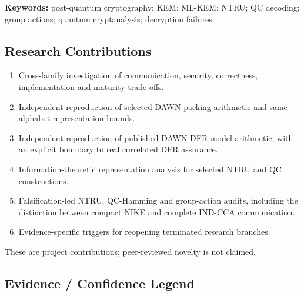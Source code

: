 \documentclass[
  10pt,
  a4paper,
]{article}
\providecommand{\tightlist}{%
  \setlength{\itemsep}{0pt}\setlength{\parskip}{0pt}}
\begin{document}
\textbf{Keywords:} post-quantum cryptography; KEM; ML-KEM; NTRU; QC
decoding; group actions; quantum cryptanalysis; decryption failures.

\hypertarget{research-contributions}{%
\subsection{Research Contributions}\label{research-contributions}}

\begin{enumerate}
\def\labelenumi{\arabic{enumi}.}
\tightlist
\item
  Cross-family investigation of communication, security, correctness,
  implementation and maturity trade-offs.
\item
  Independent reproduction of selected DAWN packing arithmetic and
  same-alphabet representation bounds.
\item
  Independent reproduction of published DAWN DFR-model arithmetic, with
  an explicit boundary to real correlated DFR assurance.
\item
  Information-theoretic representation analysis for selected NTRU and QC
  constructions.
\item
  Falsification-led NTRU, QC-Hamming and group-action audits, including
  the distinction between compact NIKE and complete IND-CCA
  communication.
\item
  Evidence-specific triggers for reopening terminated research branches.
\end{enumerate}

These are project contributions; peer-reviewed novelty is not claimed.

\hypertarget{evidence-confidence-legend}{%
\subsection{Evidence / Confidence
Legend}\label{evidence-confidence-legend}}
\end{document}
